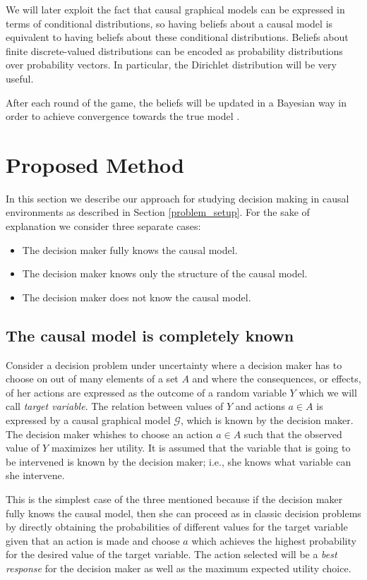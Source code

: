 \documentclass{article}
\begin{document}
We will later exploit the fact that causal graphical models can be expressed in terms of conditional distributions, so having beliefs about a causal model is equivalent to having beliefs about these conditional distributions. Beliefs about finite discrete-valued distributions can be encoded as probability distributions over probability vectors. In particular, the Dirichlet distribution will be very useful.

After each round of the game, the beliefs will be updated in a Bayesian way in order to achieve convergence towards the true model \cite{shoham2008multiagent}.

\section{Proposed Method}
In this section we describe our approach for studying decision making in causal environments as described in Section \ref{problem_setup}. For the sake of explanation we consider three separate cases:

\begin{itemize}
\item The decision maker fully knows the causal model.
\item The decision maker knows only the structure of the causal model.
\item The decision maker does not know the causal model.
\end{itemize}

\subsection{The causal model is completely known}
Consider a decision problem under uncertainty where a decision maker has to choose on out of many elements of a set $A$ and where the consequences, or effects, of her actions are expressed as the outcome of a random variable $Y$ which we will call \textit{target variable}. The relation between values of $Y$ and actions $a \in A$ is expressed by a causal graphical model $\mathcal{G}$, which is known by the decision maker. The decision maker whishes to choose an action $a \in A$ such that the observed value of $Y$ maximizes her utility. It is assumed that the variable that is going to be intervened is known by the decision maker; i.e., she knows what variable can she intervene.

This is the simplest case of the three mentioned because if the decision maker fully knows the causal model, then she can proceed as in classic decision problems by directly obtaining the probabilities of different values for the target variable given that an action is made and choose $a$ which achieves the highest probability for the desired value of the target variable. The action selected will be a \textit{best response} for the decision maker as well as the maximum expected utility choice.
\end{document}

